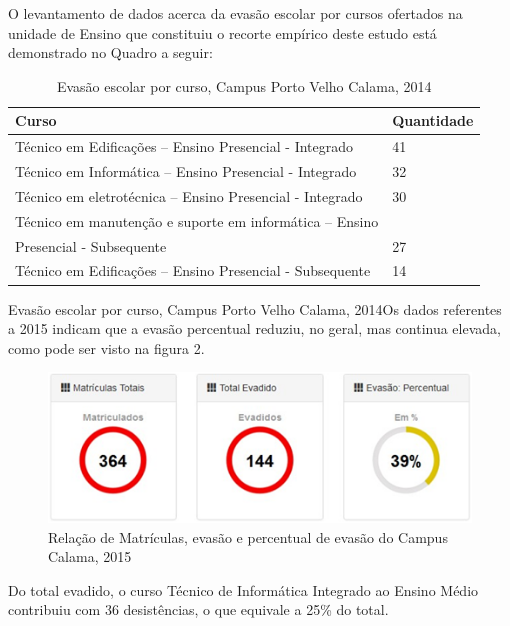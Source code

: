 \documentclass[article,12pt,onesidea,4paper,english,brazil]{abntex2}
\begin{document}
	O levantamento de dados acerca da evasão escolar por cursos ofertados na unidade de Ensino que constituiu o recorte empírico deste estudo está demonstrado no Quadro a seguir:
	\begin{table}[h]
		\centering
		\caption{Evasão escolar por curso, Campus Porto Velho Calama, 2014}
		\label{my-label}
		\begin{tabular}{ll}
			\hline
			\textbf{Curso}                                             & \textbf{Quantidade} \\
			\hline
			Técnico em Edificações – Ensino Presencial - Integrado   & 41         \\
			Técnico em Informática – Ensino Presencial - Integrado   & 32         \\
			Técnico em eletrotécnica – Ensino Presencial - Integrado & 30         \\
			Técnico em manutenção e suporte em informática – Ensino  &            \\
			Presencial - Subsequente                                 & 27         \\
			Técnico em Edificações – Ensino Presencial - Subsequente & 14 \\ \hline         
		\end{tabular}
	\end{table}

Evasão escolar por curso, Campus Porto Velho Calama, 2014Os dados referentes a 2015 indicam que a evasão percentual reduziu, no geral, mas continua elevada, como pode ser visto na figura 2.

\begin{figure}[h]
	\centering
	\includegraphics[width=0.7\linewidth]{pip-artigo09-02}
	\caption{Relação de Matrículas, evasão e percentual de evasão do Campus Calama, 2015}
	\label{fig:pip-artigo09-02}
\end{figure}

	Do total evadido, o curso Técnico de Informática Integrado ao Ensino Médio contribuiu com 36 desistências, o que equivale a 25\% do total.
	
\end{document}
